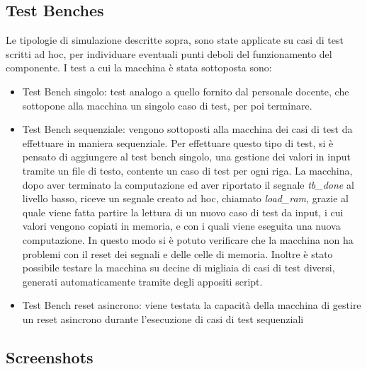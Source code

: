 \documentclass{article}
\begin{document}
\subsection{Test Benches}

Le tipologie di simulazione descritte sopra, sono state applicate su casi di test scritti ad hoc, per individuare eventuali punti deboli del funzionamento del componente. I test a cui la macchina è stata sottoposta sono:

\begin{itemize}

\item Test Bench singolo: test analogo a quello fornito dal personale docente, che sottopone alla macchina un singolo caso di test, per poi terminare.

\item Test Bench sequenziale: vengono sottoposti alla macchina dei casi di test da effettuare in maniera sequenziale. Per effettuare questo tipo di test, si è pensato di aggiungere al test bench singolo, una gestione dei valori in input tramite un file di testo, contente un caso di test per ogni riga. La macchina, dopo aver terminato la computazione ed aver riportato il segnale \textit{tb{\_}done} al livello basso, riceve un segnale creato ad hoc, chiamato \textit{load{\_}ram}, grazie al quale viene fatta partire la lettura di un nuovo caso di test da input, i cui valori vengono copiati in memoria, e con i quali viene eseguita una nuova computazione. In questo modo si è potuto verificare che la macchina non ha problemi con il reset dei segnali e delle celle di memoria. Inoltre è stato possibile testare la macchina su decine di migliaia di casi di test diversi, generati automaticamente tramite degli appositi script. 

\item Test Bench reset asincrono: viene testata la capacità della macchina di gestire un reset asincrono durante l'esecuzione di casi di test sequenziali 

\end{itemize}



\newpage
\subsection{Screenshots}
\end{document}
